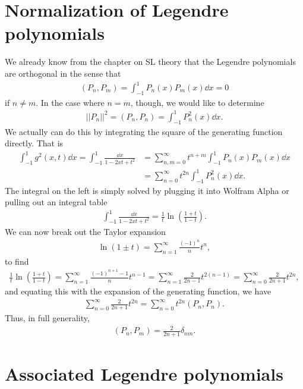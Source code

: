 \section{Normalization of Legendre polynomials}

We already know from the chapter on SL theory that the Legendre polynomials are orthogonal in the sense that
\begin{eqnarray}
    (P_{n},P_{m}) = \int_{-1}^{1} P_{n}(x) P_{m}(x) \dd{x} = 0
\end{eqnarray}
if $n \ne m$.
In the case where $n = m$, though, we would like to determine
\begin{eqnarray}
    || P_{n} ||^2 = (P_{n},P_{n}) = \int_{-1}^{1} P_{n}^2(x) \dd{x}
.\end{eqnarray}
We actually can do this by integrating the square of the generating function directly.
That is
\begin{align}
    \int_{-1}^{1} g^2(x,t) \dd{x} = \int_{-1}^{1} \frac{\dd{x}}{1 - 2xt + t^2} &= \sum_{n,m=0}^{\infty} t^{n+m} \int_{-1}^{1} P_{n}(x) P_{m}(x) \dd{x} \nonumber \\
    &= \sum_{n=0}^{\infty} t^{2n} \int_{-1}^{1} P_{n}^2(x) \dd{x}
.\end{align}
The integral on the left is simply solved by plugging it into Wolfram Alpha or pulling out an integral table
\begin{align}
    \int_{-1}^{1} \frac{\dd{x}}{1 - 2xt + t^2} = \frac{1}{t} \ln( \frac{1 + t}{1 - t} )
.\end{align}
We can now break out the Taylor expansion
\begin{eqnarray}
    \ln(1 \pm t) = \sum_{n=1}^{\infty} \frac{(-1)^{n}}{n} t^{n}
,\end{eqnarray}
to find
\begin{align}
    \frac{1}{t} \ln( \frac{1 + t}{1 - t} ) = \sum_{n=1}^{\infty} \frac{(-1)^{n+1} - 1}{n} t^{n-1} = \sum_{n=1}^{\infty} \frac{2}{2n-1} t^{2(n-1)} = \sum_{n=0}^{\infty} \frac{2}{2n+1} t^{2n}
,\end{align}
and equating this with the expansion of the generating function, we have
\begin{eqnarray}
    \sum_{n=0}^{\infty} \frac{2}{2n+1} t^{2n} = \sum_{n=0}^{\infty} t^{2n} (P_{n},P_{n})
.\end{eqnarray}
Thus, in full generality,
\begin{eqnarray}
    (P_{n},P_{m}) = \frac{2}{2n+1} \delta_{nm}
.\end{eqnarray}


\section{Associated Legendre polynomials}

